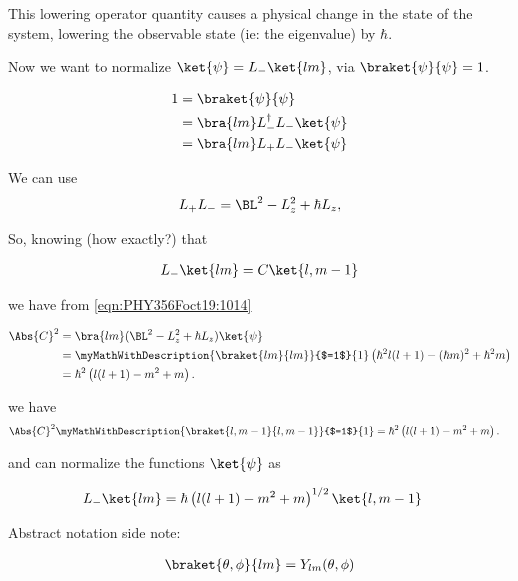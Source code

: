 This lowering operator quantity causes a physical change in the state of the system, lowering the observable state (ie: the eigenvalue) by $\hbar$.

Now we want to normalize $\ket{\psi} = L_{-} \ket{lm}$, via $\braket{\psi}{\psi} = 1$.

\begin{align*}
1
&= \braket{\psi}{\psi} \\
&= \bra{lm} L_{-}^\dagger L_{-} \ket{\psi} \\
&= \bra{lm} L_{+} L_{-} \ket{\psi}
\end{align*}

We can use
\begin{align}\label{eqn:PHY356Foct19:1014}
L_{+} L_{-} = \BL^2 - L_z^2 + \hbar L_z,
\end{align}

So, knowing (how exactly?) that

\begin{align}\label{eqn:PHY356Foct19:1015}
L_{-} \ket{lm} = C \ket{l,m-1}
\end{align}

we have from \ref{eqn:PHY356Foct19:1014}

\begin{align*}
\Abs{C}^2
&= \bra{lm} (\BL^2 - L_z^2 + \hbar L_z ) \ket{\psi}  \\
&= \myMathWithDescription{\braket{lm}{lm}}{$=1$}{1} \left(\hbar^2 l(l+1) - (\hbar m)^2 + \hbar^2 m \right)  \\
&= \hbar^2 \left(l(l+1) - m^2 + m \right).
\end{align*}

we have
\begin{align}\label{eqn:PHY356Foct19:1016}
\Abs{C}^2 \myMathWithDescription{\braket{l,m-1}{l,m-1}}{$=1$}{1}
&= \hbar^2 \left(l(l+1) - m^2 + m \right).
\end{align}

and can normalize the functions $\ket{\psi}$ as

\begin{align}\label{eqn:PHY356Foct19:1017}
L_{-} \ket{lm} &= \hbar \left(l(l+1) - m^2 + m \right)^{1/2} \ket{l, m-1}
\end{align}

Abstract notation side note:

\begin{align}\label{eqn:PHY356Foct19:1018}
\braket{\theta,\phi}{lm} = Y_{lm}(\theta, \phi)
\end{align}

